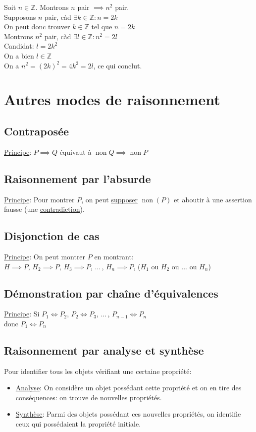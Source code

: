 \documentclass[10pt,a4paper]{article}
\theoremstyle{definition}
\DeclareMathOperator{\non}{non}
\begin{document}
\noindent Soit $n \in \mathbb{Z}$. Montrons $n$ pair $\implies n^2$ pair. \\
Supposons $n$ pair, càd $\exists k \in \mathbb{Z}: n = 2k$ \\
On peut donc trouver $k \in \mathbb{Z}$ tel que $n = 2k$ \\
Montrons $n^2$ pair, càd $\exists l \in \mathbb{Z}: n^2 = 2l$ \\
Candidat: $l = 2k^2$ \\
On a bien $l \in \mathbb{Z}$ \\
On a $n^2 = (2k)^2 = 4k^2 = 2l$, ce qui conclut.

\section{Autres modes de raisonnement}
\subsection{Contraposée}
\noindent \uline{Principe}: $P \implies Q$ équivaut à $\non Q \implies \non P$

\subsection{Raisonnement par l'absurde}
\noindent \uline{Principe}: Pour montrer $P$, on peut \uline{supposer} $\non(P)$ et aboutir à une assertion fausse (une \uline{contradiction}).

\subsection{Disjonction de cas}
\noindent \uline{Principe}: On peut montrer $P$ en montrant: \\
$H \implies P$, $H_2 \implies P$, $H_3 \implies P$, ...\,, $H_n \implies P$, ($H_1$ ou $H_2$ ou ... ou $H_n$)

\subsection{Démonstration par chaîne d'équivalences}
\noindent \uline{Principe}: Si $P_1 \iff P_2$, $P_2 \iff P_3$, ...\,, $P_{n - 1} \iff P_n$ \\
donc $P_1 \iff P_n$

\subsection{Raisonnement par analyse et synthèse}
\noindent Pour identifier tous les objets vérifiant une certaine propriété:
\begin{itemize}
\item \uline{Analyse}: On considère un objet possédant cette propriété et on en tire des conséquences: on trouve de nouvelles propriétés.
\item \uline{Synthèse}: Parmi des objets possédant ces nouvelles propriétés, on identifie ceux qui possédaient la propriété initiale.
\end{itemize}
\end{document}
